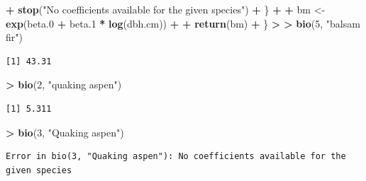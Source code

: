 \documentclass[]{krantz}
\makeatletter
\newenvironment{Shaded}{\begin{snugshade}}{\end{snugshade}}
\newcommand{\KeywordTok}[1]{\textcolor[rgb]{0.27,0.27,0.27}{\textbf{#1}}}
\newcommand{\DecValTok}[1]{\textcolor[rgb]{0.06,0.06,0.06}{#1}}
\newcommand{\StringTok}[1]{\textcolor[rgb]{0.5,0.5,0.5}{#1}}
\newcommand{\OperatorTok}[1]{\textcolor[rgb]{0.43,0.43,0.43}{\textbf{#1}}}
\newcommand{\ErrorTok}[1]{\textcolor[rgb]{0.14,0.14,0.14}{\textbf{#1}}}
\newcommand{\NormalTok}[1]{#1}
\newenvironment{kframe}{%
\medskip{}
\setlength{\fboxsep}{.8em}
 \def\at@end@of@kframe{}%
 \ifinner\ifhmode%
  \def\at@end@of@kframe{\end{minipage}}%
  \begin{minipage}{\columnwidth}%
 \fi\fi%
 \def\FrameCommand##1{\hskip\@totalleftmargin \hskip-\fboxsep
 \colorbox{shadecolor}{##1}\hskip-\fboxsep
     \hskip-\linewidth \hskip-\@totalleftmargin \hskip\columnwidth}%
 \MakeFramed {\advance\hsize-\width
   \@totalleftmargin\z@ \linewidth\hsize
   \@setminipage}}%
 {\par\unskip\endMakeFramed%
 \at@end@of@kframe}
\renewenvironment{Shaded}{\begin{kframe}}{\end{kframe}}
\theoremstyle{definition}
\theoremstyle{definition}
\theoremstyle{definition}
\theoremstyle{remark}
\makeatother
\begin{document}
\begin{Shaded}
\begin{Highlighting}[]
\OperatorTok{+}\StringTok{     }\KeywordTok{stop}\NormalTok{(}\StringTok{"No coefficients available for the given species"}\NormalTok{)}
\OperatorTok{+}\StringTok{   }\NormalTok{\}}
\OperatorTok{+}\StringTok{   }
\OperatorTok{+}\StringTok{   }\NormalTok{bm <-}\StringTok{ }\KeywordTok{exp}\NormalTok{(beta.}\DecValTok{0} \OperatorTok{+}\StringTok{ }\NormalTok{beta.}\DecValTok{1} \OperatorTok{*}\StringTok{ }\KeywordTok{log}\NormalTok{(dbh.cm))}
\OperatorTok{+}\StringTok{   }
\OperatorTok{+}\StringTok{   }\KeywordTok{return}\NormalTok{(bm)}
\OperatorTok{+}\StringTok{ }\NormalTok{\}}
\OperatorTok{>}\StringTok{ }
\ErrorTok{>}\StringTok{ }\KeywordTok{bio}\NormalTok{(}\DecValTok{5}\NormalTok{, }\StringTok{"balsam fir"}\NormalTok{)}
\end{Highlighting}
\end{Shaded}

\begin{verbatim}
[1] 43.31
\end{verbatim}

\begin{Shaded}
\begin{Highlighting}[]
\OperatorTok{>}\StringTok{ }\KeywordTok{bio}\NormalTok{(}\DecValTok{2}\NormalTok{, }\StringTok{"quaking aspen"}\NormalTok{)}
\end{Highlighting}
\end{Shaded}

\begin{verbatim}
[1] 5.311
\end{verbatim}

\begin{Shaded}
\begin{Highlighting}[]
\OperatorTok{>}\StringTok{ }\KeywordTok{bio}\NormalTok{(}\DecValTok{3}\NormalTok{, }\StringTok{"Quaking aspen"}\NormalTok{)}
\end{Highlighting}
\end{Shaded}

\begin{verbatim}
Error in bio(3, "Quaking aspen"): No coefficients available for the given species
\end{verbatim}
\end{document}
